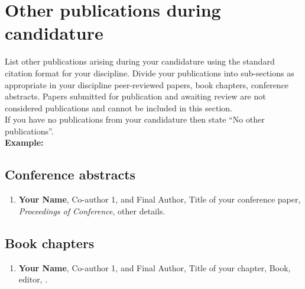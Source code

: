 
\nocite{macklin-cordes_phylogenetic_2020,
        macklin-cordes_re-evaluating_2020}
\printbibliography[keyword={post2016_inprep},heading=none]



\section*{Other publications during candidature}

\begin{instructional}
    List other publications arising during your candidature using the standard citation format for your discipline. Divide your publications into sub-sections as appropriate in your discipline \eg{} peer-reviewed papers, book chapters, conference abstracts. Papers submitted for publication and awaiting review are not considered publications and cannot be included in this section.\\
    
    \noindent
    If you have no publications from your candidature then state ``No other publications''.\\
    
    \textbf{Example:}
    \subsection*{Conference abstracts}

    \begin{enumerate}

    \item \cite{DumyCitationKey} \textbf{Your Name}, Co-author 1, and Final Author, Title of your conference paper, \textit{Proceedings of Conference}, other details.

    \end{enumerate}

    \subsection*{Book chapters}

    \begin{enumerate}

    \item \cite{DumyCitationKey} \textbf{Your Name}, Co-author 1, and Final Author, Title of your chapter, Book, editor, \etc{}.

    \end{enumerate}

\end{instructional}

